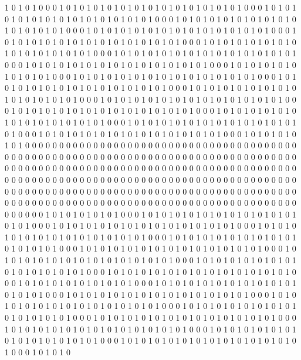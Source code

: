 1 0 1 0 1 0 0 0 1 0 1 0 1 0 1 0 1 0 1 0 1 0 1 0 1 0 1 0 1 0 1 0 1 0 1 0 0 0 1 0 1 0 1 0 1 0 1 0 1 0 1 0 1 0 1 0 1 0 1 0 1 0 1 0 1 0 0 0 1 0 1 0 1 0 1 0 1 0 1 0 1 0 1 0 1 0 1 0 1 0 1 0 1 0 1 0 0 0 1 0 1 0 1 0 1 0 1 0 1 0 1 0 1 0 1 0 1 0 1 0 1 0 1 0 1 0 0 0 1 0 1 0 1 0 1 0 1 0 1 0 1 0 1 0 1 0 1 0 1 0 1 0 1 0 1 0 0 0 1 0 1 0 1 0 1 0 1 0 1 0 1 0 1 0 1 0 1 0 1 0 1 0 1 0 1 0 0 0 1 0 1 0 1 0 1 0 1 0 1 0 1 0 1 0 1 0 1 0 1 0 1 0 1 0 1 0 0 0 1 0 1 0 1 0 1 0 1 0 1 0 1 0 1 0 1 0 1 0 1 0 1 0 1 0 1 0 0 0 1 0 1 0 1 0 1 0 1 0 1 0 
1 0 1 0 1 0 0 0 1 0 1 0 1 0 1 0 1 0 1 0 1 0 1 0 1 0 1 0 1 0 1 0 1 0 1 0 0 0 1 0 1 0 1 0 1 0 1 0 1 0 1 0 1 0 1 0 1 0 1 0 1 0 1 0 1 0 0 0 1 0 1 0 1 0 1 0 1 0 1 0 1 0 1 0 1 0 1 0 1 0 1 0 1 0 1 0 0 0 1 0 1 0 1 0 1 0 1 0 1 0 1 0 1 0 1 0 1 0 1 0 1 0 1 0 1 0 0 0 1 0 1 0 1 0 1 0 1 0 1 0 1 0 1 0 1 0 1 0 1 0 1 0 1 0 1 0 0 0 1 0 1 0 1 0 1 0 1 0 1 0 1 0 1 0 1 0 1 0 1 0 1 0 1 0 1 0 0 0 1 0 1 0 1 0 1 0 1 0 1 0 1 0 1 0 1 0 1 0 1 0 1 0 1 0 1 0 0 0 1 0 1 0 1 0 1 0 1 0 1 0 1 0 1 0 1 0 1 0 1 0 1 0 1 0 1 0 0 0 1 0 1 0 1 0 1 0 1 0 1 0 
0 0 0 0 0 0 0 0 0 0 0 0 0 0 0 0 0 0 0 0 0 0 0 0 0 0 0 0 0 0 0 0 0 0 0 0 0 0 0 0 0 0 0 0 0 0 0 0 0 0 0 0 0 0 0 0 0 0 0 0 0 0 0 0 0 0 0 0 0 0 0 0 0 0 0 0 0 0 0 0 0 0 0 0 0 0 0 0 0 0 0 0 0 0 0 0 0 0 0 0 0 0 0 0 0 0 0 0 0 0 0 0 0 0 0 0 0 0 0 0 0 0 0 0 0 0 0 0 0 0 0 0 0 0 0 0 0 0 0 0 0 0 0 0 0 0 0 0 0 0 0 0 0 0 0 0 0 0 0 0 0 0 0 0 0 0 0 0 0 0 0 0 0 0 0 0 0 0 0 0 0 0 0 0 0 0 0 0 0 0 0 0 0 0 0 0 0 0 0 0 0 0 0 0 0 0 0 0 0 0 0 0 0 0 0 0 0 0 0 0 0 0 0 0 0 0 0 0 0 0 0 0 0 0 0 0 0 0 0 0 0 0 0 0 0 0 0 0 0 0 0 0 0 0 0 0 0 0 0 0 
1 0 1 0 1 0 1 0 1 0 1 0 0 0 1 0 1 0 1 0 1 0 1 0 1 0 1 0 1 0 1 0 1 0 1 0 1 0 1 0 1 0 0 0 1 0 1 0 1 0 1 0 1 0 1 0 1 0 1 0 1 0 1 0 1 0 1 0 1 0 1 0 0 0 1 0 1 0 1 0 1 0 1 0 1 0 1 0 1 0 1 0 1 0 1 0 1 0 1 0 1 0 0 0 1 0 1 0 1 0 1 0 1 0 1 0 1 0 1 0 1 0 1 0 1 0 1 0 1 0 1 0 0 0 1 0 1 0 1 0 1 0 1 0 1 0 1 0 1 0 1 0 1 0 1 0 1 0 1 0 1 0 0 0 1 0 1 0 1 0 1 0 1 0 1 0 1 0 1 0 1 0 1 0 1 0 1 0 1 0 1 0 0 0 1 0 1 0 1 0 1 0 1 0 1 0 1 0 1 0 1 0 1 0 1 0 1 0 1 0 1 0 0 0 1 0 1 0 1 0 1 0 1 0 1 0 1 0 1 0 1 0 1 0 1 0 1 0 1 0 1 0 0 0 1 0 1 0 1 0 
1 0 1 0 1 0 1 0 1 0 1 0 0 0 1 0 1 0 1 0 1 0 1 0 1 0 1 0 1 0 1 0 1 0 1 0 1 0 1 0 1 0 0 0 1 0 1 0 1 0 1 0 1 0 1 0 1 0 1 0 1 0 1 0 1 0 1 0 1 0 1 0 0 0 1 0 1 0 1 0 1 0 1 0 1 0 1 0 1 0 1 0 1 0 1 0 1 0 1 0 1 0 0 0 1 0 1 0 1 0 1 0 1 0 1 0 1 0 1 0 1 0 1 0 1 0 1 0 1 0 1 0 0 0 1 0 1 0 1 0 1 0 1 0 1 0 1 0 1 0 1 0 1 0 1 0 1 0 1 0 1 0 0 0 1 0 1 0 1 0 1 0 1 0 1 0 1 0 1 0 1 0 1 0 1 0 1 0 1 0 1 0 0 0 1 0 1 0 1 0 1 0 1 0 1 0 1 0 1 0 1 0 1 0 1 0 1 0 1 0 1 0 0 0 1 0 1 0 1 0 1 0 1 0 1 0 1 0 1 0 1 0 1 0 1 0 1 0 1 0 1 0 0 0 1 0 1 0 1 0 

